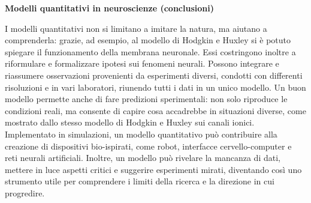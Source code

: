 \documentclass[12pt,a4paper,openany]{book}
\begin{document}
\textbf{Modelli quantitativi in neuroscienze (conclusioni)}

I modelli quantitativi non si limitano a imitare la natura, ma aiutano a comprenderla: grazie, ad esempio, al modello di Hodgkin e Huxley si è potuto spiegare il funzionamento della membrana neuronale. Essi costringono inoltre a riformulare e formalizzare ipotesi sui fenomeni neurali. Possono integrare e riassumere osservazioni provenienti da esperimenti diversi, condotti con differenti risoluzioni e in vari laboratori, riunendo tutti i dati in un unico modello. Un buon modello permette anche di fare predizioni sperimentali: non solo riproduce le condizioni reali, ma consente di capire cosa accadrebbe in situazioni diverse, come mostrato dallo stesso modello di Hodgkin e Huxley sui canali ionici. Implementato in simulazioni, un modello quantitativo può contribuire alla creazione di dispositivi bio-ispirati, come robot, interfacce cervello-computer e reti neurali artificiali. Inoltre, un modello può rivelare la mancanza di dati, mettere in luce aspetti critici e suggerire esperimenti mirati, diventando così uno strumento utile per comprendere i limiti della ricerca e la direzione in cui progredire.
\end{document}
